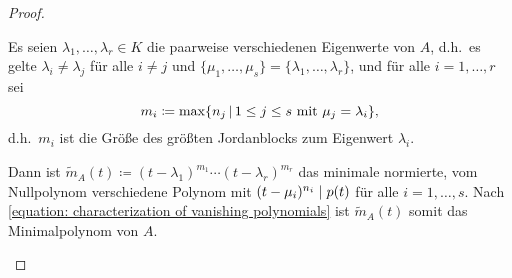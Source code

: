 \documentclass[a4paper,10pt]{scrartcl}
\begin{document}
\begin{proof}
\begin{itemize}
      Es seien $\lambda_1, \dotsc, \lambda_r \in K$ die paarweise verschiedenen Eigenwerte von $A$, d.h.\ es gelte $\lambda_i \neq \lambda_j$ für alle $i \neq j$ und $\{\mu_1, \dotsc, \mu_s\} = \{\lambda_1, \dotsc, \lambda_r\}$, und für alle $i = 1, \dotsc, r$ sei
      \[
        m_i \coloneqq \max\{ n_j \,|\, \text{$1 \leq j \leq s$ mit $\mu_j = \lambda_i$} \},
      \]
      d.h.\ $m_i$ ist die Größe des größten Jordanblocks zum Eigenwert $\lambda_i$.
      
      Dann ist $\tilde{m}_A(t) \coloneqq (t - \lambda_1)^{m_1} \dotsb (t - \lambda_r)^{m_r}$ das minimale normierte, vom Nullpolynom verschiedene Polynom mit $(t - \mu_i)^{n_i} \mathrel{|} p(t)$ für alle $i = 1, \dotsc, s$.
      Nach \eqref{equation: characterization of vanishing polynomials} ist $\tilde{m}_A(t)$ somit das Minimalpolynom von $A$.
    \qedhere
  \end{itemize}
\end{proof}
\end{document}

